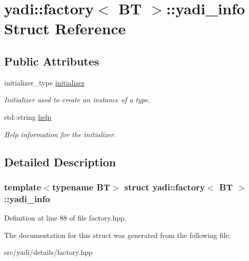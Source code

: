 \hypertarget{structyadi_1_1factory_1_1yadi__info}{}\section{yadi\+:\+:factory$<$ BT $>$\+:\+:yadi\+\_\+info Struct Reference}
\label{structyadi_1_1factory_1_1yadi__info}
\subsection*{Public Attributes}
\begin{DoxyCompactItemize}
\item 
\mbox{\label{structyadi_1_1factory_1_1yadi__info_a63c0e3eb9fd1e8051f5aacee3439c313}} 
initializer\+\_\+type \hyperlink{structyadi_1_1factory_1_1yadi__info_a63c0e3eb9fd1e8051f5aacee3439c313}{initializer}
\begin{DoxyCompactList}\small\item\em Initializer used to create an instance of a type. \end{DoxyCompactList}\item 
\mbox{\label{structyadi_1_1factory_1_1yadi__info_a5b9a7705a796247d0049755236516015}} 
std\+::string \hyperlink{structyadi_1_1factory_1_1yadi__info_a5b9a7705a796247d0049755236516015}{help}
\begin{DoxyCompactList}\small\item\em Help information for the initializer. \end{DoxyCompactList}\end{DoxyCompactItemize}


\subsection{Detailed Description}
\subsubsection*{template$<$typename BT$>$\newline
struct yadi\+::factory$<$ B\+T $>$\+::yadi\+\_\+info}



Definition at line 88 of file factory.\+hpp.



The documentation for this struct was generated from the following file\+:\begin{DoxyCompactItemize}
\item 
src/yadi/details/factory.\+hpp\end{DoxyCompactItemize}
